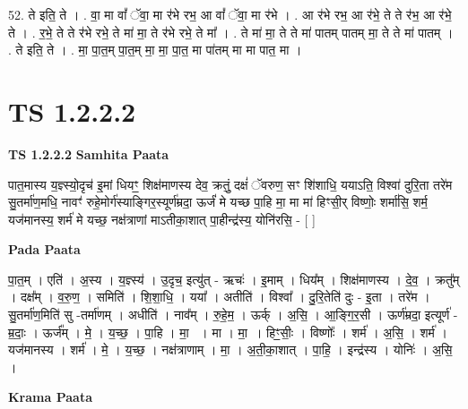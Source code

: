 \documentclass[17pt]{extarticle}
\begin{document}
52. ते इति॒ ते । . वा॒ मा वां᳚ ॅवा॒ मा र॑भे रभ॒ आ वां᳚ ॅवा॒ मा र॑भे । . आ र॑भे रभ॒ आ र॑भे॒ ते ते र॑भ॒ आ र॑भे॒ ते । . र॒भे॒ ते ते र॑भे रभे॒ ते मा॑ मा॒ ते र॑भे रभे॒ ते मा᳚ । . ते मा॑ मा॒ ते ते मा॑ पातम् पातम् मा॒ ते ते मा॑ पातम् । . ते इति॒ ते । . मा॒ पा॒त॒म् पा॒त॒म् मा॒ मा॒ पा॒त॒ मा पा॑तम् मा मा पात॒ मा । \newline
\pagebreak
{}
\section*{ TS 1.2.2.2 }

\textbf{TS 1.2.2.2 } \newline
\textbf{Samhita Paata} \newline

पात॒मास्य य॒ज्ञ्स्यो॒दृच॑ इ॒मां धियꣳ॒॒ शिक्ष॑माणस्य देव॒ क्रतुं॒ दक्षं॑ ॅवरुण॒ सꣳ शि॑शाधि॒ ययाऽति॒ विश्वा॑ दुरि॒ता तरे॑म सु॒तर्मा॑ण॒मधि॒ नावꣳ॑ रुहे॒मोर्ग॑स्याङ्गिर॒स्यूर्ण॑म्रदा॒ ऊर्जं॑ मे यच्छ पा॒हि मा॒ मा मा॑ हिꣳसी॒र् विष्णोः॒ शर्मा॑सि॒ शर्म॒ यज॑मानस्य॒ शर्म॑ मे यच्छ॒ नक्ष॑त्राणां माऽतीका॒शात् पा॒हीन्द्र॑स्य॒ योनि॑रसि॒ - [ ] \newline

\textbf{Pada Paata} \newline

पा॒त॒म् । एति॑ । अ॒स्य । य॒ज्ञ्स्य॑ । उ॒दृच॒ इत्यु॑त् - ऋचः॑ । इ॒माम् । धिय᳚म् । शिक्ष॑माणस्य । दे॒व॒ । क्रतु᳚म् । दक्ष᳚म् । व॒रु॒ण॒ । समिति॑ । शि॒शा॒धि॒ । यया᳚ । अतीति॑ । विश्वा᳚ । दु॒रि॒तेति॑ दुः - इ॒ता । तरे॑म । सु॒तर्मा॑ण॒मिति॑ सु -तर्मा॑णम् । अधीति॑ । नाव᳚म् । रु॒हे॒म॒ । ऊर्क् । अ॒सि॒ । आ॒ङ्गि॒र॒सी । ऊर्ण॑म्रदा॒ इत्यूर्ण॑ - म्र॒दाः॒ । ऊर्ज᳚म् । मे॒ । य॒च्छ॒ । पा॒हि । मा॒  । मा । मा॒ । हिꣳ॒॒सीः॒ । विष्णोः᳚ । शर्म॑ । अ॒सि॒ । शर्म॑ । यज॑मानस्य । शर्म॑ । मे॒ । य॒च्छ॒ । नक्ष॑त्राणाम् । मा॒ । अ॒ती॒का॒शात् । पा॒हि॒ । इन्द्र॑स्य । योनिः॑ । अ॒सि॒ ।  \newline


\textbf{Krama Paata} \newline
\end{document}
